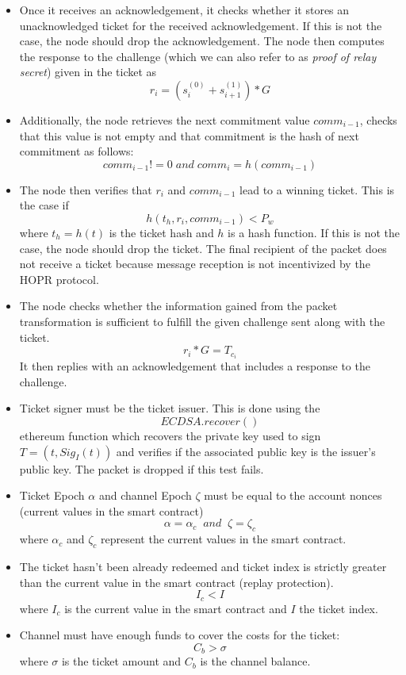 \begin{itemize}
    \item Once it receives an acknowledgement, it checks whether it stores an unacknowledged ticket for the received acknowledgement.
If this is not the case, the node should drop the acknowledgement.
\newline The node then computes the response to the challenge (which we can also refer to as \textit{proof of relay secret}) given in the ticket as $$r_i=(s_i^{(0)}+s_{i+1}^{(1)})*G$$
\item Additionally, the node retrieves the next commitment value $comm_{i-1}$, checks that this value is not empty and that commitment is the hash of next commitment as follows:
$$ comm_{i-1} != 0 \; and \; comm_{i}=h(comm_{i-1})$$
\item The node then verifies that $r_i$ and $comm_{i-1}$ lead to a winning ticket.
This is the case if $$h(t_h, r_i, comm_{i-1} ) <P_w$$ where $t_h=h(t)$ is the ticket hash and $h$ is a hash function.
If this is not the case, the node should drop the ticket.
The final recipient of the packet does not receive a ticket because message reception is not incentivized by the HOPR protocol.
\item  The node checks whether the information gained from the packet transformation is sufficient to fulfill the given challenge sent along with the ticket. $$r_i*G=T_{c_i}$$
It then replies with an acknowledgement that includes a response to the challenge.
\item Ticket signer must be the ticket issuer. This is done using the $$ECDSA.recover()$$ ethereum function which recovers the private key used to sign $T= (t, Sig_I(t))$ and verifies if the associated public key is the issuer's public key. The packet is dropped if this test fails.
\item Ticket Epoch $\alpha$ and channel Epoch $\zeta$ must be equal to the account nonces (current values in the smart contract) $$\alpha=\alpha_c \;\; and \;\; \zeta=\zeta_c$$
where $\alpha_c$ and $\zeta_c$ represent the current values in the smart contract.
\item The ticket hasn't been already redeemed and ticket index is strictly greater than the current value in the smart contract (replay protection).
     $$I_c <I$$ where $I_c$ is the current value in the smart contract and $I$ the ticket index.
\item Channel must have enough funds to cover the costs for the ticket: $$ C_b>\sigma$$ where $\sigma$ is the ticket amount and $C_b$ is the channel balance.
   


\end{itemize}








